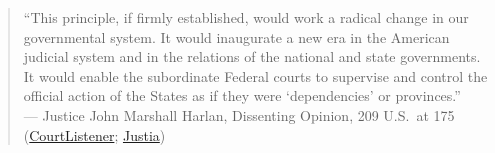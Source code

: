\documentclass[12pt]{article}
\begin{document}
\begin{quote}
``This principle, if firmly established, would work a radical change in our governmental system. It would inaugurate a new era in the American judicial system and in the relations of the national and state governments. It would enable the subordinate Federal courts to supervise and control the official action of the States as if they were `dependencies' or provinces.''\\
--- Justice John Marshall Harlan, Dissenting Opinion, 209 U.S.\ at 175 (\href{https://www.courtlistener.com/opinion/96819/ex-parte-young/}{CourtListener}; \href{https://supreme.justia.com/cases/federal/us/209/123/}{Justia})
\end{quote}
\end{document}
